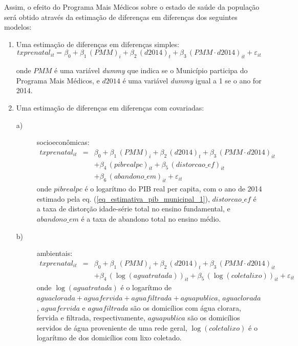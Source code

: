 \documentclass[twoside,onecolumn,12pt]{article}
\numberwithin{outputctr}{section}
\begin{document}
Assim, o efeito do Programa Mais M\'{e}dicos sobre o estado de saúde da população ser\'{a} obtido atrav\'{e}s da estima\c{c}\~{a}o de diferen\c{c}as em diferen\c{c}as dos seguintes modelos:
\begin{enumerate}
 \item Uma estima\c{c}\~{a}o de diferen\c{c}as em diferen\c{c}as simples:
  \begin{equation}
  txprenatal_{it} = \beta_0 + \beta_1 \, (PMM)_{i} + \beta_2 \, (d2014)_{t} + \beta_3 \, (PMM \cdot d2014)_{it} + \varepsilon_{it}
  \label{eq_mod_txprenatal}
  \end{equation}
  
  \noindent onde $PMM$ \'{e} uma vari\'{a}vel \textit{dummy} que indica se o Munic\'{i}pio participa do Programa Mais M\'{e}dicos, e
  $d2014$ \'{e} uma vari\'{a}vel \textit{dummy} igual a 1 se o ano for 2014.

 \item Uma estima\c{c}\~{a}o de diferen\c{c}as em diferen\c{c}as com covariadas:
  \begin{description}
   \item[a)] socioeconômicas:
    \begin{equation}
    \begin{array}{rcl}
     txprenatal_{it} & = & \beta_0 + \beta_1 \, (PMM)_{i} + \beta_2 \, (d2014)_{t} + \beta_3 \, (PMM \cdot d2014)_{it} \\
     ~               & ~ & + \beta_4 \, (pibrealpc)_{it} + \beta_5 \, (distorcao\_ef)_{it} \\
     ~               & ~ & + \beta_6 \, (abandono\_em)_{it} + \varepsilon_{it}
    \end{array}
    \label{eq_mod_txprenatal_cov1}
    \end{equation}
    \noindent onde 
    $pibrealpc$ \'{e} o logar\'{i}tmo do PIB real per capita, com o ano de 2014 estimado pela eq. (\ref{eq_estimativa_pib_municipal_1}),
    $distorcao\_ef$ \'{e} a taxa de distor\c{c}\~{a}o idade-s\'{e}rie total no ensino fundamental, e
    $abandono\_em$ \'{e} a taxa de abandono total no ensino m\'{e}dio.

    \item[b)] ambientais:
    \begin{equation}
    \begin{array}{rcl}
     txprenatal_{it} & = & \beta_0 + \beta_1 \, (PMM)_{i} + \beta_2 \, (d2014)_{t} + \beta_3 \, (PMM \cdot d2014)_{it} \\
     ~               & ~ & + \beta_4 \, (\log{(aguatratada)})_{it} + \beta_5 \, (\log{(coletalixo)})_{it} + \varepsilon_{it}
    \end{array}
    \label{eq_mod_txprenatal_cov2}
    \end{equation}
    \noindent onde $\log{(aguatratada)}$ \'{e} o logar\'{i}tmo de $aguaclorada + aguafervida + aguafiltrada + aguapublica$,
    $aguaclorada$, $aguafervida$ e $aguafiltrada$ s\~{a}o os domic\'{i}lios com \'{a}gua clorara, fervida e filtrada, respectivamente,
    $aguapublica$ s\~{a}o os domic\'{i}lios servidos de \'{a}gua proveniente de uma rede geral,
    $\log{(coletalixo)}$ \'{e} o logar\'{i}tmo de dos domic\'{i}lios com lixo coletado.
    

\end{description}
\end{enumerate}
\end{document}
